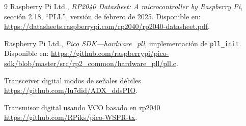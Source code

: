 \documentclass[11pt,a4paper]{article}
\begin{document}
\begin{thebibliography}{9}
Raspberry Pi Ltd., \emph{RP2040 Datasheet: A microcontroller by Raspberry Pi},
sección 2.18, ``PLL'', versión de febrero de 2025. Disponible en:
\url{https://datasheets.raspberrypi.com/rp2040/rp2040-datasheet.pdf}.

Raspberry Pi Ltd., \emph{Pico SDK---hardware\_pll}, implementación de
\texttt{pll\_init}. Disponible en:
\url{https://github.com/raspberrypi/pico-sdk/blob/master/src/rp2_common/hardware_pll/pll.c}.

Transceiver digital modos de señales débiles
\url{https://github.com/lu7did/ADX_ddsPIO}.

Transmisor digital usando VCO basado en rp2040
\url{https://github.com/RPiks/pico-WSPR-tx}.

\end{thebibliography}
\end{document}
